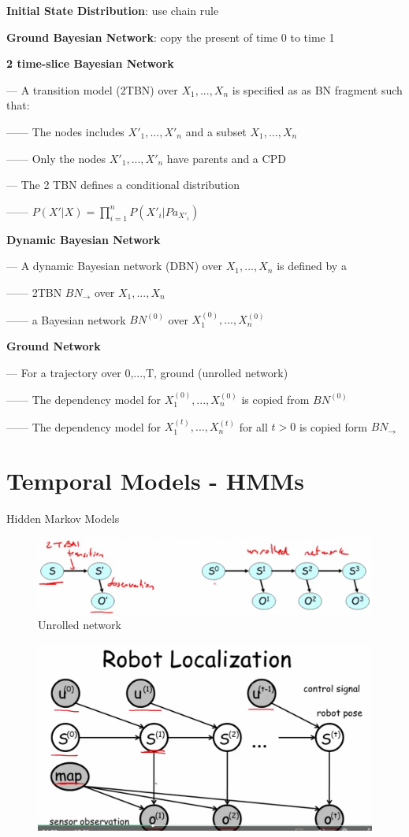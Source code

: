 \documentclass{book}
\begin{document}
\textbf{Initial State Distribution}: use chain rule

\textbf{Ground Bayesian Network}: copy the present of time 0 to time 1

\textbf{2 time-slice Bayesian Network}

--- A transition model (2TBN) over $X_1, ..., X_n$ is specified as as BN fragment such that:

------ The nodes includes $X'_1, ... , X'_n$ and a subset $X_1,..., X_n$

------ Only the nodes $X'_1,...,X'_n$ have parents and a CPD

--- The 2 TBN defines a conditional distribution

------ $P(X'|X) = \prod_{i=1}^{n} P(X'_i | Pa_{X'_i})$

\textbf{Dynamic Bayesian Network}

--- A dynamic Bayesian network (DBN) over $X_1,...,X_n$ is defined by a

------ 2TBN $BN_{\rightarrow}$ over $X_1,..., X_n$

------ a Bayesian network $BN^{(0)}$ over $X_1^{(0)},...,X_n^{(0)}$

\textbf{Ground Network}

--- For a trajectory over 0,...,T, ground (unrolled network)

------ The dependency model for $X_1^{(0)},...,X_n^{(0)}$ is copied from $BN^{(0)}$

------ The dependency model for $X_1^{(t)},...,X_n^{(t)}$ for all $t > 0$ is copied form $BN_{\rightarrow}$



\section{Temporal Models - HMMs}

Hidden Markov Models

\begin{figure}[h]
\centering
\includegraphics[width=0.7\linewidth]{./figures/markovmodel}
\caption{Unrolled network}
\label{fig:markovmodel}
\end{figure}

\begin{figure}[h]
\centering
\includegraphics[width=0.7\linewidth]{./figures/robot}
\caption{}
\label{fig:robot}
\end{figure}
\end{document}
